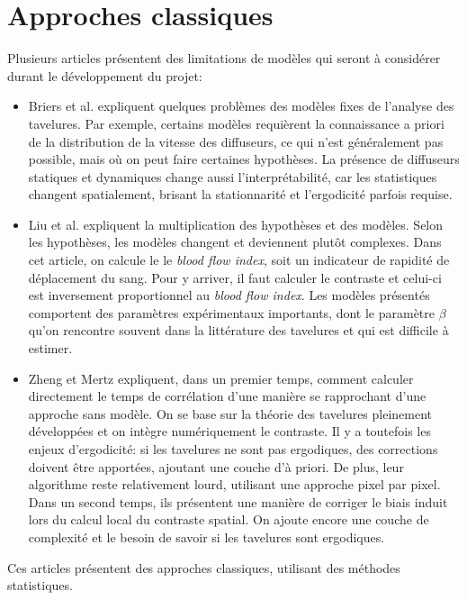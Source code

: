 \documentclass[MSc,french]{ulthese}
\begin{document}
\section{Approches classiques}
Plusieurs articles présentent des limitations de modèles qui seront à considérer durant le développement du projet:
\begin{itemize}
\item Briers et al. \cite{briers_laser_2013} expliquent quelques problèmes des modèles fixes de l'analyse des tavelures. Par exemple, certains modèles requièrent la connaissance a priori de la distribution de la vitesse des diffuseurs, ce qui n'est généralement pas possible, mais où on peut faire certaines hypothèses. La présence de diffuseurs statiques et dynamiques change aussi l'interprétabilité, car les statistiques changent spatialement, brisant la stationnarité et l'ergodicité parfois requise.
\item Liu et al. \cite{liu_choosing_2021} expliquent la multiplication des hypothèses et des modèles. Selon les hypothèses, les modèles changent et deviennent plutôt complexes. Dans cet article, on calcule le le \textit{blood flow index}, soit un indicateur de rapidité de déplacement du sang. Pour y arriver, il faut calculer le contraste et celui-ci est inversement proportionnel au \textit{blood flow index}. Les modèles présentés comportent des paramètres expérimentaux importants, dont le paramètre $\beta$ qu'on rencontre souvent dans la littérature des tavelures et qui est difficile à estimer.
\item Zheng et Mertz \cite{zheng_direct_2022, zheng_correcting_2022} expliquent, dans un premier temps, comment calculer directement le temps de corrélation d'une manière se rapprochant d'une approche sans modèle. On se base sur la théorie des tavelures pleinement développées et on intègre numériquement le contraste. Il y a toutefois les enjeux d'ergodicité: si les tavelures ne sont pas ergodiques, des corrections doivent être apportées, ajoutant une couche d'à priori. De plus, leur algorithme reste relativement lourd, utilisant une approche pixel par pixel. Dans un second temps, ils présentent une manière de corriger le biais induit lors du calcul local du contraste spatial. On ajoute encore une couche de complexité et le besoin de savoir si les tavelures sont ergodiques.
\end{itemize}
Ces articles présentent des approches classiques, utilisant des méthodes statistiques.
\end{document}
